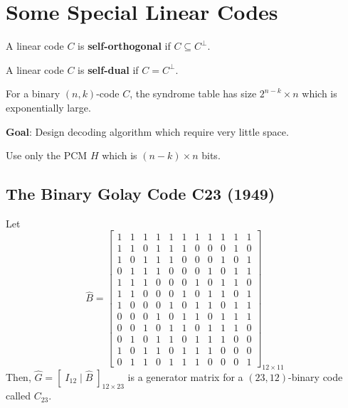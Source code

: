 \chapter{Some Special Linear Codes}
\begin{defbox}
    \begin{definition}
        A linear code $ C $ is \textbf{self-orthogonal} if $ C\subseteq C^{\perp} $.
    \end{definition}
\end{defbox}
\begin{defbox}
    \begin{definition}
        A linear code $ C $ is \textbf{self-dual} if $ C=C^{\perp} $.
    \end{definition}
\end{defbox}
For a binary $ (n,k) $-code $ C $, the syndrome table has
size $ 2^{n-k}\times n $ which is exponentially large.

\textbf{Goal}: Design decoding algorithm which require
very little space.

\begin{exbox}
    \begin{example}
        Use only the PCM $ H $ which is $ (n-k)\times n $ bits.
    \end{example}
\end{exbox}

\section{The Binary Golay Code C23 (1949)}
Let
\[
    \hat{B}=
    \left[
        \begin{array}{cccccccccccc}
            1 & 1 & 1 & 1 & 1 & 1 & 1 & 1 & 1 & 1 & 1 \\
            1 & 1 & 0 & 1 & 1 & 1 & 0 & 0 & 0 & 1 & 0 \\
            1 & 0 & 1 & 1 & 1 & 0 & 0 & 0 & 1 & 0 & 1 \\
            0 & 1 & 1 & 1 & 0 & 0 & 0 & 1 & 0 & 1 & 1 \\
            1 & 1 & 1 & 0 & 0 & 0 & 1 & 0 & 1 & 1 & 0 \\
            1 & 1 & 0 & 0 & 0 & 1 & 0 & 1 & 1 & 0 & 1 \\
            1 & 0 & 0 & 0 & 1 & 0 & 1 & 1 & 0 & 1 & 1 \\
            0 & 0 & 0 & 1 & 0 & 1 & 1 & 0 & 1 & 1 & 1 \\
            0 & 0 & 1 & 0 & 1 & 1 & 0 & 1 & 1 & 1 & 0 \\
            0 & 1 & 0 & 1 & 1 & 0 & 1 & 1 & 1 & 0 & 0 \\
            1 & 0 & 1 & 1 & 0 & 1 & 1 & 1 & 0 & 0 & 0 \\
            0 & 1 & 1 & 0 & 1 & 1 & 1 & 0 & 0 & 0 & 1
        \end{array}
        \right]_{12\times 11} \]
Then, $ \hat{G}=\left[\; I_{12}\mid \hat{B}\; \right]_{12\times 23} $
is a generator matrix for a $ (23,12) $-binary code called $ C_{23} $.


